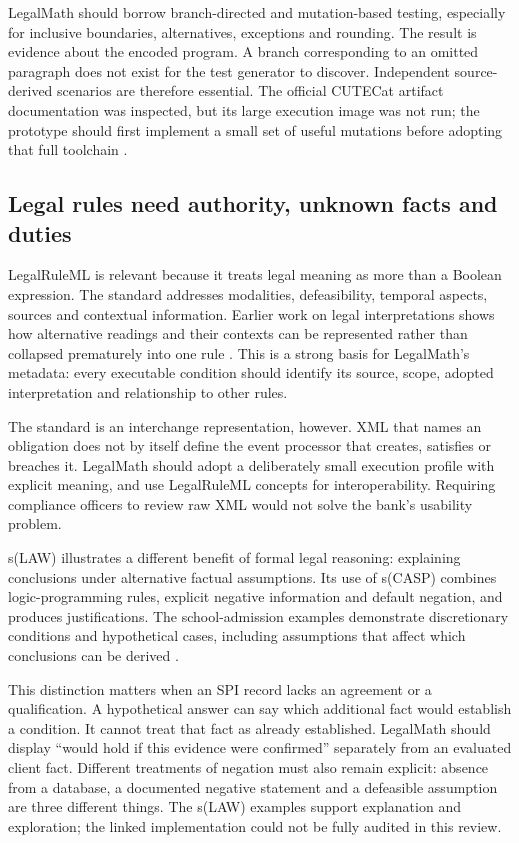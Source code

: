 LegalMath should borrow branch-directed and mutation-based testing, especially
for inclusive boundaries, alternatives, exceptions and rounding. The result is
evidence about the encoded program. A branch corresponding to an omitted
paragraph does not exist for the test generator to discover. Independent
source-derived scenarios are therefore essential. The official CUTECat artifact
documentation was inspected, but its large execution image was not run; the
prototype should first implement a small set of useful mutations before adopting
that full toolchain \citep{libraryreview}.

\subsection{Legal rules need authority, unknown facts and duties}

LegalRuleML is relevant because it treats legal meaning as more than a Boolean
expression. The standard addresses modalities, defeasibility, temporal aspects,
sources and contextual information. Earlier work on legal interpretations shows
how alternative readings and their contexts can be represented rather than
collapsed prematurely into one rule
\citep[sec.~4]{legalinterpretations2014,legalruleml2021}. This is a strong basis
for LegalMath's metadata: every executable condition should identify its source,
scope, adopted interpretation and relationship to other rules.

The standard is an interchange representation, however. XML that names an
obligation does not by itself define the event processor that creates, satisfies
or breaches it. LegalMath should adopt a deliberately small execution profile
with explicit meaning, and use LegalRuleML concepts for interoperability. Requiring
compliance officers to review raw XML would not solve the bank's usability problem.

s(LAW) illustrates a different benefit of formal legal reasoning: explaining
conclusions under alternative factual assumptions. Its use of s(CASP) combines
logic-programming rules, explicit negative information and default negation, and
produces justifications. The school-admission examples demonstrate discretionary
conditions and hypothetical cases, including assumptions that affect which
conclusions can be derived \citep[secs.~4--5]{slaw2024}.

This distinction matters when an SPI record lacks an agreement or a qualification.
A hypothetical answer can say which additional fact would establish a condition.
It cannot treat that fact as already established. LegalMath should display
``would hold if this evidence were confirmed'' separately from an evaluated
client fact. Different treatments of negation must also remain explicit: absence
from a database, a documented negative statement and a defeasible assumption are
three different things. The s(LAW) examples support explanation and exploration;
the linked implementation could not be fully audited in this review.

